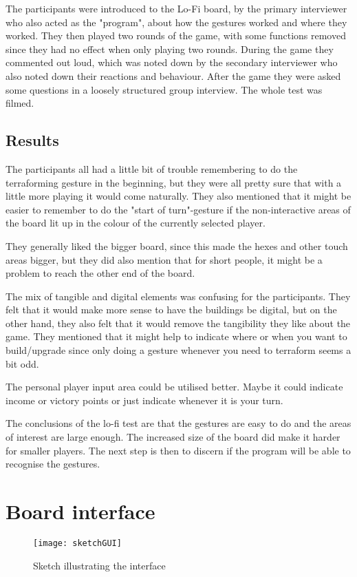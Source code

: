 The participants were introduced to the Lo-Fi board, by the primary interviewer who also acted as the "program", about how the gestures worked and where they worked. They then played two rounds of the game, with some functions removed since they had no effect when only playing two rounds. During the game they commented out loud, which was noted down by the secondary interviewer who also noted down their reactions and behaviour. 
After the game they were asked some questions in a loosely structured group interview. 
The whole test was filmed.

\subsection{Results} 
The participants all had a little bit of trouble remembering to do the terraforming gesture in the beginning, but they were all pretty sure that with a little more playing it would come naturally. They also mentioned that it might be easier to remember to do the "start of turn"-gesture if the non-interactive areas of the board lit up in the colour of the currently selected player. 

They generally liked the bigger board, since this made the hexes and other touch areas bigger, but they did also mention that for short people, it might be a problem to reach the other end of the board. 

The mix of tangible and digital elements was confusing for the participants. They felt that it would make more sense to have the buildings be digital, but on the other hand, they also felt that it would remove the tangibility they like about the game. They mentioned that it might help to indicate where or when you want to build/upgrade since only doing a gesture whenever you need to terraform seems a bit odd. 

The personal player input area could be utilised better. Maybe it could indicate income or victory points or just indicate whenever it is your turn. 

The conclusions of the lo-fi test are that the gestures are easy to do and the areas of interest are large enough. The increased size of the board did make it harder for smaller players. The next step is then to discern if the program will be able to recognise the gestures. 

\section{Board interface}\label{sec:BoardInterface}
\begin{figure}
\centering
\texttt{[image: sketchGUI]}
\caption{Sketch illustrating the interface}
\label{fig:sketchGUI}
\end{figure}

